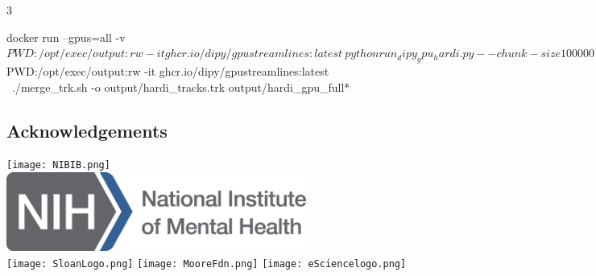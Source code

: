 \documentclass[a0, landscape]{a0poster}
\begin{document}
\begin{multicols}{3}
\begin{itemize}
\small

docker run --gpus=all -v ${PWD}:/opt/exec/output:rw -it ghcr.io/dipy/gpustreamlines:latest \
 python run_dipy_gpu_hardi.py --chunk-size 100000 --ngpus 1 --output-prefix output/hardi_gpu_full --use-fast-write

 docker run --gpus=all -v ${PWD}:/opt/exec/output:rw -it ghcr.io/dipy/gpustreamlines:latest \
 ./merge_trk.sh -o output/hardi_tracks.trk output/hardi_gpu_full*

\end{itemize}

\color{DarkSlateGray} %


\nocite{*} %
\footnotesize  %

\subsection*{Acknowledgements} \footnotesize


\texttt{[image: NIBIB.png]}
\includegraphics[height=2.6cm]{nimh-logo.png} \\
\texttt{[image: SloanLogo.png]}
\texttt{[image: MooreFdn.png]}
\texttt{[image: eSciencelogo.png]}

\end{multicols}
\end{document}
